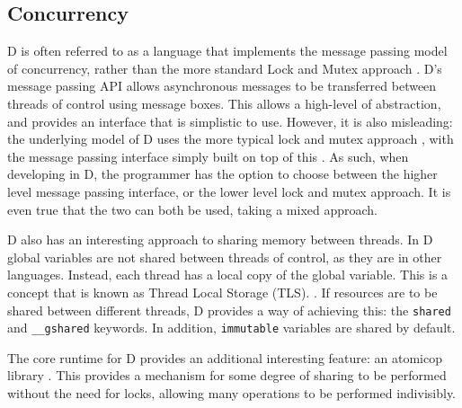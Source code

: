 \subsection{Concurrency}
D is often referred to as a language that implements the message passing model 
of concurrency, rather than the more standard Lock and Mutex approach 
\cite{http://ddili.org/ders/d.en/concurrency.html}. D's message passing API 
allows asynchronous messages to be transferred between threads of control using 
message boxes. This allows a high-level of abstraction, and provides an 
interface that is simplistic to use. However, it is also misleading: the underlying 
model of D uses the more typical lock and mutex approach 
\cite{https://github.com/D-Programming-Language/druntime/blob/master/src/core/sync/mutex.d}, 
with the message passing interface simply built on top of this 
\cite{https://github.com/D-Programming-Language/phobos/blob/master/std/concurrency.d}. 
As such, when developing in D, the programmer has the option to choose between 
the higher level message passing interface, or the lower level lock and mutex 
approach. It is even true that the two can both be used, taking a mixed approach. 
\par\bigskip\noindent
D also has an interesting approach to sharing memory between threads. In D 
global variables are not shared between threads of control, as they are in 
other languages. Instead, each thread has a local copy of the global variable. 
This is a concept that is known as Thread Local Storage (TLS). 
\cite{http://dlang.org/migrate-to-shared.html}. 
If resources are to be shared between different threads, D provides a way of 
achieving this: the \texttt{shared} and \texttt{\_\_gshared} keywords. In addition, 
\texttt{immutable} variables are shared by default. 
\par\bigskip\noindent
The core runtime for D provides an additional interesting feature: an atomicop 
library 
\cite{http://dlang.org/phobos/core_atomic.html}. 
This provides a mechanism for some degree of sharing to be performed without the 
need for locks, allowing many operations to be performed indivisibly.


